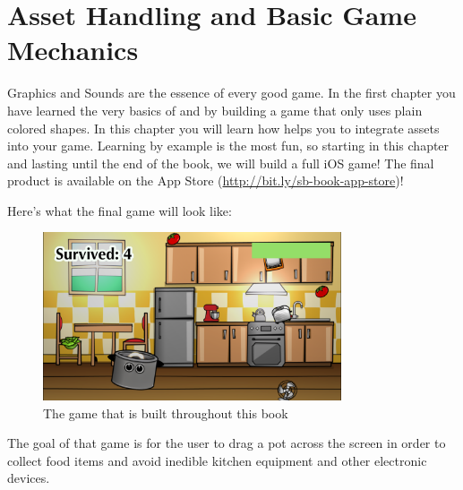 \chapter{Asset Handling and Basic Game Mechanics}

Graphics and Sounds are the essence of every good game. In the first chapter
you have learned the very basics of \SB{} and \cocos{} by building a game that only
uses plain colored shapes. In this chapter you will learn how \SB{} helps you to
integrate assets into your game. Learning by example is the most fun, so
starting in this chapter and lasting until the end of the book, we will build
a full iOS game! The final product is available on the App Store
(\url{http://bit.ly/sb-book-app-store})!

Here's what the final game will look like:
\begin{figure}[H]
    \centering
    \includegraphics[width=250pt]{images/Chapter2/final_game.png}
    \caption{The game that is built throughout this book}
\end{figure}

The goal of that game is for the user to drag a pot across the screen in order
to collect food items and avoid inedible kitchen equipment and other electronic
devices.

